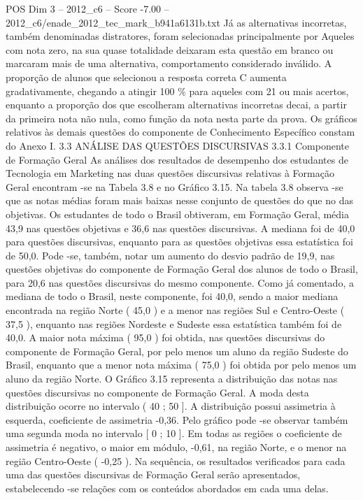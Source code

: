 \begin{textsample}{POS Dim 3 – 2012\_c6 – Score -7.00 – 2012\_c6/enade\_2012\_tec\_mark\_b941a6131b.txt}
Já as alternativas incorretas, também denominadas distratores, foram selecionadas principalmente por Aqueles com nota zero, na sua quase totalidade deixaram esta questão em branco ou marcaram mais de uma alternativa, comportamento considerado inválido.
A proporção de alunos que selecionou a resposta correta C aumenta gradativamente, chegando a atingir 100 \% para aqueles com 21 ou mais acertos, enquanto a proporção dos que escolheram alternativas incorretas decai, a partir da primeira nota não nula, como função da nota nesta parte da prova.
Os gráficos relativos às demais questões do componente de Conhecimento Específico constam do Anexo I. 3.3 ANÁLISE DAS QUESTÕES DISCURSIVAS 3.3.1 Componente de Formação Geral As análises dos resultados de desempenho dos estudantes de Tecnologia em Marketing nas duas questões discursivas relativas à Formação Geral encontram -se na Tabela 3.8 e no Gráfico 3.15.
Na tabela 3.8 observa -se que as notas médias foram mais baixas nesse conjunto de questões do que no das objetivas.
Os estudantes de todo o Brasil obtiveram, em Formação Geral, média 43,9 nas questões objetivas e 36,6 nas questões discursivas.
A mediana foi de 40,0 para questões discursivas, enquanto para as questões objetivas essa estatística foi de 50,0.
Pode -se, também, notar um aumento do desvio padrão de 19,9, nas questões objetivas do componente de Formação Geral dos alunos de todo o Brasil, para 20,6 nas questões discursivas do mesmo componente.
Como já comentado, a mediana de todo o Brasil, neste componente, foi 40,0, sendo a maior mediana encontrada na região Norte ( 45,0 ) e a menor nas regiões Sul e Centro-Oeste ( 37,5 ), enquanto nas regiões Nordeste e Sudeste essa estatística também foi de 40,0.
A maior nota máxima ( 95,0 ) foi obtida, nas questões discursivas do componente de Formação Geral, por pelo menos um aluno da região Sudeste do Brasil, enquanto que a menor nota máxima ( 75,0 ) foi obtida por pelo menos um aluno da região Norte.
O Gráfico 3.15 representa a distribuição das notas nas questões discursivas no componente de Formação Geral.
A moda desta distribuição ocorre no intervalo ( 40 ; 50 ].
A distribuição possui assimetria à esquerda, coeficiente de assimetria -0,36.
Pelo gráfico pode -se observar também uma segunda moda no intervalo [ 0 ; 10 ].
Em todas as regiões o coeficiente de assimetria é negativo, o maior em módulo, -0,61, na região Norte, e o menor na região Centro-Oeste ( -0,25 ).
Na sequência, os resultados verificados para cada uma das questões discursivas de Formação Geral serão apresentados, estabelecendo -se relações com os conteúdos abordados em cada uma delas.

\end{textsample}
